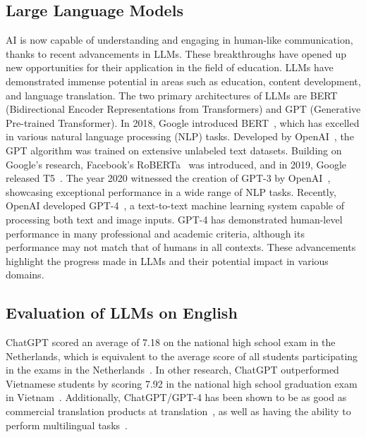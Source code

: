 \documentclass[11pt]{article}
\begin{document}
\subsection{Large Language Models}

AI is now capable of understanding and engaging in human-like communication, thanks to recent advancements in LLMs. These breakthroughs have opened up new opportunities for their application in the field of education. LLMs have demonstrated immense potential in areas such as education, content development, and language translation. The two primary architectures of LLMs are BERT (Bidirectional Encoder Representations from Transformers) and GPT (Generative Pre-trained Transformer). In 2018, Google introduced BERT~\cite{devlin2018bert}, which has excelled in various natural language processing (NLP) tasks. Developed by OpenAI~\cite{alec2018improving}, the GPT algorithm was trained on extensive unlabeled text datasets. Building on Google's research, Facebook's RoBERTa~\cite{liu2019roberta} was introduced, and in 2019, Google released T5~\cite{raffel2020exploring}. The year 2020 witnessed the creation of GPT-3 by OpenAI~\cite{brown2020language}, showcasing exceptional performance in a wide range of NLP tasks. Recently, OpenAI developed GPT-4~\cite{OpenAI_gpt_4_report}, a text-to-text machine learning system capable of processing both text and image inputs. GPT-4 has demonstrated human-level performance in many professional and academic criteria, although its performance may not match that of humans in all contexts. These advancements highlight the progress made in LLMs and their potential impact in various domains.

\subsection{Evaluation of LLMs on English}

ChatGPT scored an average of 7.18 on the national high school exam in the Netherlands, which is equivalent to the average score of all students participating in the exams in the Netherlands~\cite{de2023can}. In other research, ChatGPT outperformed Vietnamese students by scoring 7.92 in the national high school graduation exam in Vietnam~\cite{dao2023eng}. Additionally, ChatGPT/GPT-4 has been shown to be as good as commercial translation products at translation~\cite{jiao2023chatgpt}, as well as having the ability to perform multilingual tasks~\cite{bang2023multitask}.
\end{document}

